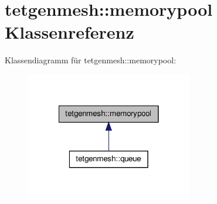 \hypertarget{classtetgenmesh_1_1memorypool}{\section{tetgenmesh\-:\-:memorypool Klassenreferenz}
\label{classtetgenmesh_1_1memorypool}
}


Klassendiagramm für tetgenmesh\-:\-:memorypool\-:\nopagebreak
\begin{figure}[H]
\begin{center}
\leavevmode
\includegraphics[width=206pt]{classtetgenmesh_1_1memorypool__inherit__graph}
\end{center}
\end{figure}
